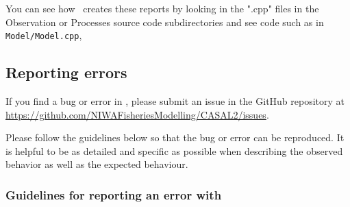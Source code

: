 You can see how \CNAME\ creates these reports by looking in the ".cpp" files in the Observation or Processes source code subdirectories and see code such as in \texttt{Model/Model.cpp},



\subsection{Reporting errors\label{sec:reporting-errors}}

If you find a bug or error in \CNAME, please submit an issue in the GitHub repository at \url{https://github.com/NIWAFisheriesModelling/CASAL2/issues}.

Please follow the guidelines below so that the bug or error can be reproduced. It is helpful to be as detailed and specific as possible when describing the observed behavior as well as the expected behaviour.

\subsubsection{Guidelines for reporting an error with \CNAME\label{sec:error-guidelines}}

